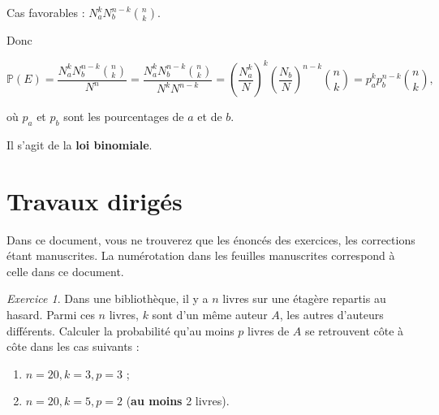 \documentclass[french]{book}
\theoremstyle{definition}
\theoremstyle{remark}
\newtheorem{exo}{Exercice}
\begin{document}
Cas favorables : $N_a ^{k} N_b ^{n-k} \binom{n}{k}$.

Donc

\begin{equation*}
  \mathbb{P}( E ) = \frac{N_a ^{k} N_b ^{n-k} \binom{n}{k}}{N ^{n}} = \frac{N_a ^{k} N_b ^{n-k} \binom{n}{k}}{N ^{k} N ^{n-k}} = \left( \frac{N_a ^{k}}{N}\right) ^{k} \left( \frac{N_b}{N}\right) ^{n-k} \binom{n}{k} = p_a ^{k} p_b ^{n-k} \binom{n}{k},
\end{equation*}

où $p_a$ et $p_b$ sont les pourcentages de $a$ et de $b$.

Il s'agit de la \textbf{loi binomiale}.


\chapter*{Travaux dirigés}

Dans ce document, vous ne trouverez que les énoncés des exercices, les corrections étant manuscrites. La numérotation dans les feuilles manuscrites correspond à celle dans ce document.

\begin{exo}
  Dans une bibliothèque, il y a $n$ livres sur une étagère repartis au hasard. Parmi ces $n$ livres, $k$ sont d'un même auteur $A$, les autres d'auteurs différents. Calculer la probabilité qu'au moins $p$ livres de $A$ se retrouvent côte à côte dans les cas suivants :
  \begin{enumerate}
    \item $n=20, k=3, p=3$ ;
    \item $n=20, k=5, p=2$ (\textbf{au moins} 2 livres).
  \end{enumerate}
\end{exo}
\end{document}
